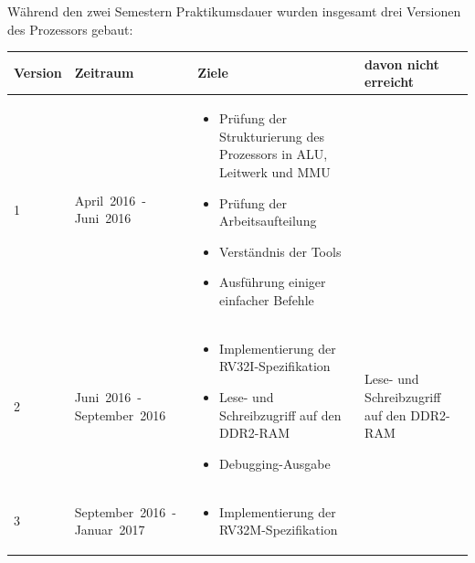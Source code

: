 W\"ahrend den zwei Semestern Praktikumsdauer wurden insgesamt drei Versionen
des Prozessors gebaut:

\begin{table}[H]
\begin{tabular}{|p{50pt}|p{80pt}|p{220pt}|p{110pt}|}
\hline
Version & Zeitraum                                   & Ziele                                                                            & davon nicht erreicht                          \\
\hline
1       & \mbox{April 2016 -} \mbox{Juni 2016}       & \begin{itemize}[noitemsep,topsep=0pt]
                                                       \item Pr\"ufung der Strukturierung des Prozessors in ALU, Leitwerk und MMU
                                                       \item Pr\"ufung der Arbeitsaufteilung
                                                       \item Verst\"andnis der Tools
                                                       \item Ausf\"uhrung einiger einfacher Befehle
                                                       \end{itemize}                                                                    &                                               \\
\hline
2       & \mbox{Juni 2016 -} \mbox{September 2016}   & \begin{itemize}[noitemsep,topsep=0pt]
                                                       \item Implementierung der RV32I-Spezifikation
                                                       \item Lese- und Schreibzugriff auf den DDR2-RAM
                                                       \item Debugging-Ausgabe
                                                       \end{itemize}                                                                    & Lese- und Schreibzugriff auf den DDR2-RAM     \\
\hline
3       & \mbox{September 2016 -} \mbox{Januar 2017} & \begin{itemize}[noitemsep,topsep=0pt]
                                                       \item Implementierung der RV32M-Spezifikation

\end{itemize}
\end{tabular}
\end{table}
